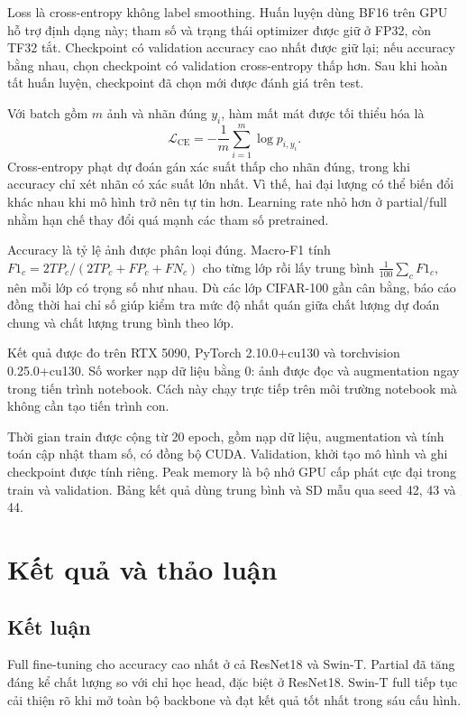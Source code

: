 \documentclass[12pt,a4paper]{report}
\begin{document}
Loss là cross-entropy không label smoothing. Huấn luyện dùng BF16 trên GPU hỗ trợ định dạng này; tham số và trạng thái optimizer được giữ ở FP32, còn TF32 tắt. Checkpoint có validation accuracy cao nhất được giữ lại; nếu accuracy bằng nhau, chọn checkpoint có validation cross-entropy thấp hơn. Sau khi hoàn tất huấn luyện, checkpoint đã chọn mới được đánh giá trên test.

Với batch gồm $m$ ảnh và nhãn đúng $y_i$, hàm mất mát được tối thiểu hóa là
\[
\mathcal{L}_{\mathrm{CE}}=-\frac{1}{m}\sum_{i=1}^{m}\log p_{i,y_i}.
\]
Cross-entropy phạt dự đoán gán xác suất thấp cho nhãn đúng, trong khi accuracy chỉ xét nhãn có xác suất lớn nhất. Vì thế, hai đại lượng có thể biến đổi khác nhau khi mô hình trở nên tự tin hơn. Learning rate nhỏ hơn ở partial/full nhằm hạn chế thay đổi quá mạnh các tham số pretrained.

Accuracy là tỷ lệ ảnh được phân loại đúng. Macro-F1 tính $F1_c=2TP_c/(2TP_c+FP_c+FN_c)$ cho từng lớp rồi lấy trung bình $\frac{1}{100}\sum_c F1_c$, nên mỗi lớp có trọng số như nhau. Dù các lớp CIFAR-100 gần cân bằng, báo cáo đồng thời hai chỉ số giúp kiểm tra mức độ nhất quán giữa chất lượng dự đoán chung và chất lượng trung bình theo lớp.

Kết quả được đo trên RTX 5090, PyTorch 2.10.0+cu130 và torchvision 0.25.0+cu130. Số worker nạp dữ liệu bằng 0: ảnh được đọc và augmentation ngay trong tiến trình notebook. Cách này chạy trực tiếp trên môi trường notebook mà không cần tạo tiến trình con.

Thời gian train được cộng từ 20 epoch, gồm nạp dữ liệu, augmentation và tính toán cập nhật tham số, có đồng bộ CUDA. Validation, khởi tạo mô hình và ghi checkpoint được tính riêng. Peak memory là bộ nhớ GPU cấp phát cực đại trong train và validation. Bảng kết quả dùng trung bình và SD mẫu qua seed 42, 43 và 44.

\chapter{Kết quả và thảo luận}


\section{Kết luận}
Full fine-tuning cho accuracy cao nhất ở cả ResNet18 và Swin-T. Partial đã tăng đáng kể chất lượng so với chỉ học head, đặc biệt ở ResNet18. Swin-T full tiếp tục cải thiện rõ khi mở toàn bộ backbone và đạt kết quả tốt nhất trong sáu cấu hình.
\end{document}
